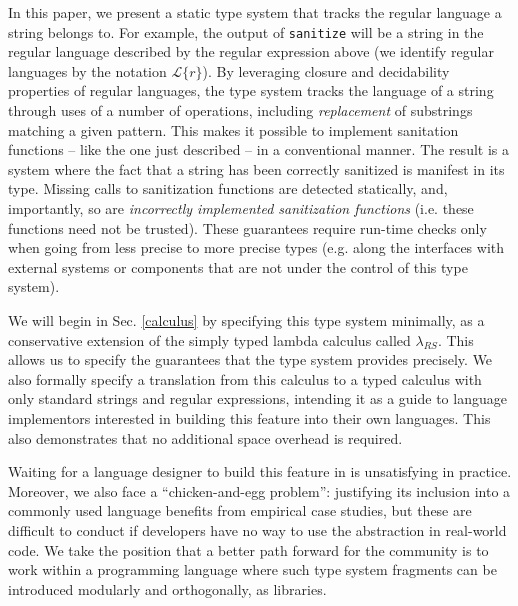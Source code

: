 \documentclass[9pt]{sig-alternate}
\theoremstyle{definition}
\newcommand{\lambdas}{\lambda_{RS}}
\begin{document}
In this paper, we present a static type system that tracks the regular language a string belongs to. For example, the output of \verb|sanitize| will be a string in the regular language described by the regular expression above (we identify regular languages by the notation $\mathcal{L}\{r\}$). By leveraging closure and decidability properties of regular languages, the type system tracks the language of a string through uses of a number of operations, including \emph{replacement} of substrings matching a given pattern. This makes it possible to implement sanitation functions -- like the one just described -- in a conventional manner. The result is a system where the fact that a string has been {correctly} sanitized is manifest in its type. Missing calls to sanitization functions are detected statically, and, importantly, so are \emph{incorrectly implemented sanitization functions} (i.e. these functions need not be trusted). These guarantees require run-time checks only when going from less precise to more precise types (e.g. along the interfaces with external systems or components that are not under the control of this type system). %

We will begin in Sec. \ref{calculus} by specifying this type system minimally, as a conservative extension of the simply typed lambda calculus called $\lambdas$. This allows us to specify the guarantees that the type system provides precisely. We also formally specify a translation from this calculus to a typed calculus with only standard strings and regular expressions, intending it as a guide to language implementors interested in building this feature into their own languages. This also demonstrates that no additional space overhead is required.

Waiting for a language designer to build this feature in is unsatisfying in practice. Moreover, we also face a ``chicken-and-egg problem'': justifying its inclusion into a commonly used language benefits from empirical case studies, but these are  difficult to conduct if developers have no way to use the abstraction in real-world code. We take the position that a better path forward for the community is to work within a programming language where such type system fragments can be introduced modularly and orthogonally, as libraries. 
\end{document}

